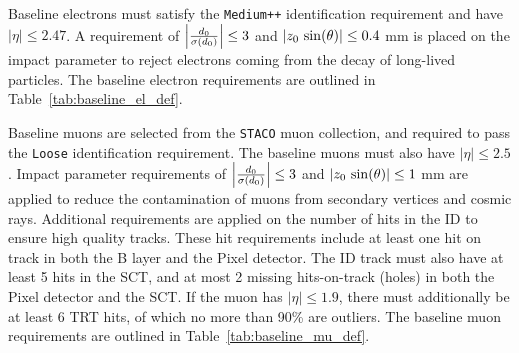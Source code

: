 Baseline electrons must satisfy the \texttt{Medium++} identification
requirement and have $|\eta| \leq 2.47$.
A requirement of $ \left| \frac{d_0}{\sigma(d_0)} \right|  \leq 3$ and
$ \left| z_0\,\sin(\theta) \right|  \leq 0.4$ mm is placed on the impact parameter
to reject electrons coming from the decay of long-lived particles.
The baseline electron requirements are outlined in
Table~\ref{tab:baseline_el_def}.

\begin{table}[ht]
\caption{Baseline electron requirements.}
\label{tab:baseline_el_def}
\end{table}

Baseline muons are selected from the \texttt{STACO} muon collection, and
required to pass the \texttt{Loose} identification requirement. The baseline
muons must also have $|\eta| \leq 2.5$.
Impact parameter requirements of $ \left| \frac{d_0}{\sigma(d_0)} \right|  \leq 3$ and
$ \left| z_0\,\sin(\theta) \right|  \leq 1$ mm are applied to reduce the contamination of muons
from secondary vertices and cosmic rays.
Additional requirements are applied on the number of hits in the ID to ensure
high quality tracks.
These  hit requirements include at least one hit on track in both the B layer
and the Pixel detector.
The ID track must also have at least 5 hits in the SCT, and at most 2 missing 
hits-on-track (holes) in both the Pixel detector and the SCT. 
If the muon has $|\eta| \leq 1.9$, there must additionally be at least 6 TRT
hits, of which no more than 90\% are outliers.
The baseline muon requirements are outlined in Table~\ref{tab:baseline_mu_def}.

